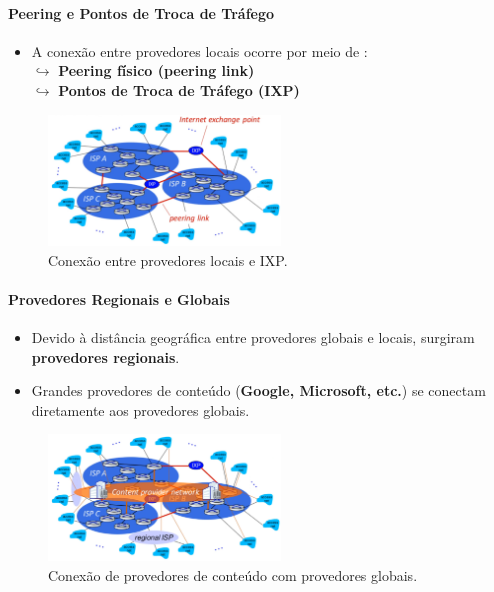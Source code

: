     \paragraph{Peering e Pontos de Troca de Tráfego}
    \begin{itemize}
        \item A conexão entre provedores locais ocorre por meio de : \\
            $\hookrightarrow$ \textbf{Peering físico (peering link)} \\
            $\hookrightarrow$ \textbf{Pontos de Troca de Tráfego (IXP)}
    \end{itemize}

    \begin{figure}[H]
        \centering
        \includegraphics[width=0.55\textwidth]{img/cap-01/infraestrutura4.png}
        \caption{Conexão entre provedores locais e IXP.}
    \end{figure}

    \paragraph{Provedores Regionais e Globais}
    \begin{itemize}
        \item Devido à distância geográfica entre provedores globais e locais, surgiram \textbf{provedores regionais}.
        \item Grandes provedores de conteúdo (\textbf{Google, Microsoft, etc.}) se conectam diretamente aos provedores globais.
    \end{itemize}

    \begin{figure}[H]
        \centering
        \includegraphics[width=0.55\textwidth]{img/cap-01/infraestrutura5.png}
        \caption{Conexão de provedores de conteúdo com provedores globais.}
    \end{figure}

